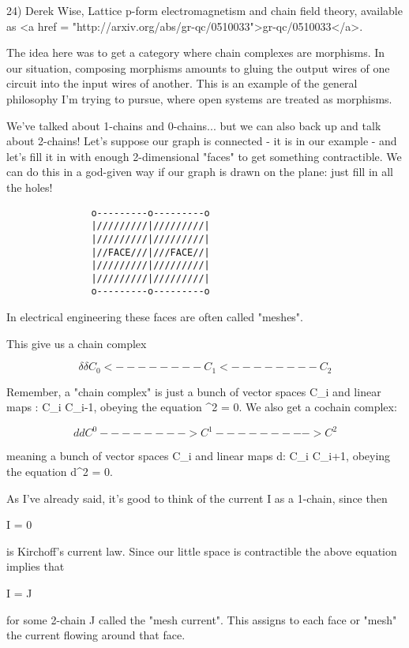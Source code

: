 24) Derek Wise, Lattice p-form electromagnetism and chain field theory,
available as <a href = "http://arxiv.org/abs/gr-qc/0510033">gr-qc/0510033</a>.

The idea here was to get a category where chain complexes are
morphisms.  In our situation, composing morphisms amounts to gluing
the output wires of one circuit into the input wires of another.  This
is an example of the general philosophy I'm trying to pursue, where
open systems are treated as morphisms.  

We've talked about 1-chains and 0-chains... but we can also back up and
talk about 2-chains!  Let's suppose our graph is connected - it is in
our example - and let's fill it in with enough 2-dimensional
"faces" to get something contractible.  We can do this in a
god-given way if our graph is drawn on the plane: just fill in all the
holes!

\begin{verbatim}
               o---------o---------o
               |/////////|/////////| 
               |/////////|/////////| 
               |//FACE///|///FACE//| 
               |/////////|/////////| 
               |/////////|/////////| 
               o---------o---------o
\end{verbatim}
    

In electrical engineering these faces are often called
"meshes".

This give us a chain complex

$$
        \delta            \delta 
C_{0} <-------- C_{1} <-------- C_{2}
$$
    

Remember, a "chain complex" is just a bunch of vector spaces C_{i} and linear maps \delta : C_{i} \to  C_{i-1}, obeying the equation \delta ^{2} = 0.  We also get a cochain complex:

$$
       d           d
C^{0} --------> C^{1} ---------> C^{2}
$$
    

meaning a bunch of vector spaces C_{i} and linear maps d: C_{i} \to  C_{i+1}, obeying the equation d^{2} = 0. 

As I've already said, it's good to think of the current I as a 1-chain,
since then

\delta I = 0 

is Kirchoff's current law.  Since our little space is contractible the
above equation implies that

I = \delta J

for some 2-chain J called the "mesh current".  This assigns to each
face or "mesh" the current flowing around that face.

